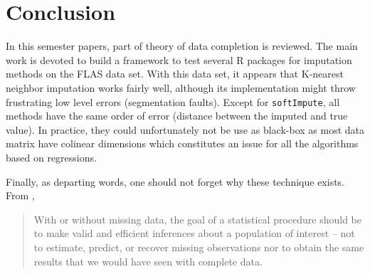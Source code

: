 \chapter{Conclusion}

In this semester papers, part of theory of data completion is reviewed. The
main work is devoted to build a framework to test several R packages for
imputation methods on the FLAS data set. With this data set, it appears that
K-nearest neighbor imputation works fairly well, although its implementation
might throw frustrating low level errors (segmentation faults). Except
for \texttt{softImpute}, all methods have the same order of error (distance
between the imputed and true value). In practice, they could unfortunately not
be use as black-box as most data matrix have colinear dimensions which
constitutes an issue for all the algorithms based on regressions.

Finally, as departing words, one should not forget why these technique
exists. From \cite{schafer2002missing},

\begin{quote}
  With or without missing data, the goal of a statistical procedure should be
  to make valid and efficient inferences about a population of interest -- not to
  estimate, predict, or recover missing observations nor to obtain the same
  results that we would have seen with complete data.
\end{quote}



